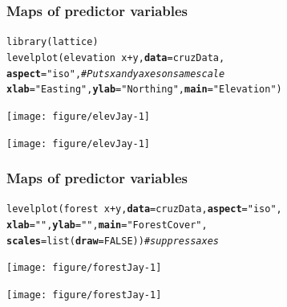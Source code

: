 \documentclass[color=usenames,dvipsnames]{beamer}\usepackage[]{graphicx}\usepackage[]{color}
\makeatletter
\newcommand{\hlnum}[1]{\textcolor[rgb]{0.69,0.494,0}{#1}}%
\newcommand{\hlstr}[1]{\textcolor[rgb]{0.749,0.012,0.012}{#1}}%
\newcommand{\hlcom}[1]{\textcolor[rgb]{0.514,0.506,0.514}{\textit{#1}}}%
\newcommand{\hlopt}[1]{\textcolor[rgb]{0,0,0}{#1}}%
\newcommand{\hlstd}[1]{\textcolor[rgb]{0,0,0}{#1}}%
\newcommand{\hlkwc}[1]{\textcolor[rgb]{0,0,0}{\textbf{#1}}}%
\newcommand{\hlkwd}[1]{\textcolor[rgb]{0.004,0.004,0.506}{#1}}%
\newenvironment{kframe}{%
 \def\at@end@of@kframe{}%
 \ifinner\ifhmode%
  \def\at@end@of@kframe{\end{minipage}}%
  \begin{minipage}{\columnwidth}%
 \fi\fi%
 \def\FrameCommand##1{\hskip\@totalleftmargin \hskip-\fboxsep
 \colorbox{shadecolor}{##1}\hskip-\fboxsep
     \hskip-\linewidth \hskip-\@totalleftmargin \hskip\columnwidth}%
 \MakeFramed {\advance\hsize-\width
   \@totalleftmargin\z@ \linewidth\hsize
   \@setminipage}}%
 {\par\unskip\endMakeFramed%
 \at@end@of@kframe}
\newenvironment{knitrout}{}{} %
\makeatother
\begin{document}
\begin{frame}[fragile]
  \frametitle{Maps of predictor variables}
  \scriptsize
\begin{knitrout}\scriptsize
{}\color{fgcolor}\begin{kframe}
\begin{alltt}
\hlkwd{library}\hlstd{(lattice)}
\hlkwd{levelplot}\hlstd{(elevation} \hlopt{~} \hlstd{x} \hlopt{+} \hlstd{y,} \hlkwc{data}\hlstd{=cruzData,}
          \hlkwc{aspect}\hlstd{=}\hlstr{"iso"}\hlstd{,} \hlcom{# Puts x and y axes on same scale}
          \hlkwc{xlab}\hlstd{=}\hlstr{"Easting"}\hlstd{,} \hlkwc{ylab}\hlstd{=}\hlstr{"Northing"}\hlstd{,} \hlkwc{main}\hlstd{=}\hlstr{"Elevation"}\hlstd{)}
\end{alltt}
\end{kframe}
\texttt{[image: figure/elevJay-1]} 

\end{knitrout}
\centering
\texttt{[image: figure/elevJay-1]} \\
\end{frame}




\begin{frame}[fragile]
  \frametitle{Maps of predictor variables}
  \scriptsize
\begin{knitrout}\scriptsize
{}\color{fgcolor}\begin{kframe}
\begin{alltt}
\hlkwd{levelplot}\hlstd{(forest} \hlopt{~} \hlstd{x} \hlopt{+} \hlstd{y,} \hlkwc{data}\hlstd{=cruzData,} \hlkwc{aspect}\hlstd{=}\hlstr{"iso"}\hlstd{,}
          \hlkwc{xlab}\hlstd{=}\hlstr{""}\hlstd{,}\hlkwc{ylab}\hlstd{=}\hlstr{""}\hlstd{,}\hlkwc{main}\hlstd{=}\hlstr{"Forest Cover"}\hlstd{,}
          \hlkwc{scales}\hlstd{=}\hlkwd{list}\hlstd{(}\hlkwc{draw}\hlstd{=}\hlnum{FALSE}\hlstd{))} \hlcom{# suppress axes}
\end{alltt}
\end{kframe}
\texttt{[image: figure/forestJay-1]} 

\end{knitrout}
\centering
\texttt{[image: figure/forestJay-1]} \\
\end{frame}
\end{document}
